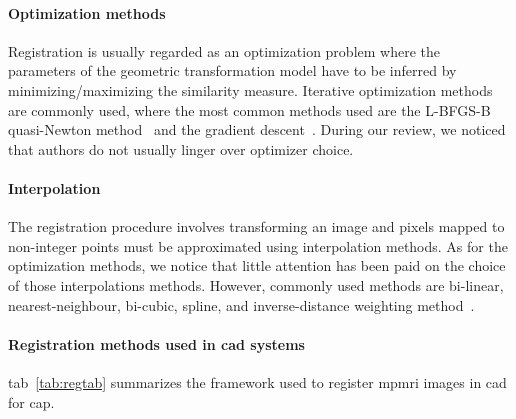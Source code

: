\paragraph{Optimization methods}
Registration is usually regarded as an optimization problem where the parameters of the geometric transformation model have to be inferred by minimizing/maximizing the similarity measure.
Iterative optimization methods are commonly used, where the most common methods used are the L-BFGS-B quasi-Newton method~\cite{Byrd1995} and the gradient descent~\cite{Viola1997}.
During our review, we noticed that authors do not usually linger over optimizer choice.

\paragraph{Interpolation} 
The registration procedure involves transforming an image and pixels mapped to non-integer points must be approximated using interpolation methods.
As for the optimization methods, we notice that little attention has been paid on the choice of those interpolations methods.
However, commonly used methods are bi-linear, nearest-neighbour, bi-cubic, spline, and inverse-distance weighting method~\cite{Mitra2012}.

\paragraph{Registration methods used in \ac{cad} systems}
\acs{tab}~\ref{tab:regtab} summarizes the framework used to register \ac{mpmri} images in \ac{cad} for \ac{cap}.

